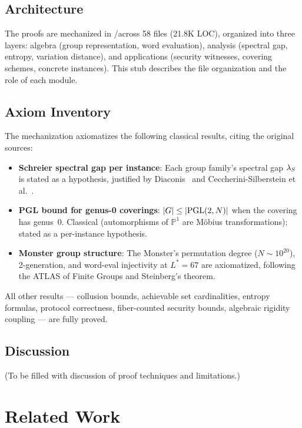 \documentclass[11pt,a4paper]{article}
\begin{document}
\subsection{Architecture}
\label{sec:arch}

The proofs are mechanized in \Rocq/\MathComp across 58 files (21.8K LOC), organized into three layers: algebra (group representation, word evaluation), analysis (spectral gap, entropy, variation distance), and applications (security witnesses, covering schemes, concrete instances).
This stub describes the file organization and the role of each module.

\subsection{Axiom Inventory}
\label{sec:axioms}

The mechanization axiomatizes the following classical results, citing the original sources:
\begin{itemize}
  \item \textbf{Schreier spectral gap per instance}: Each group family's spectral gap $\lambda_S$ is stated as a hypothesis, justified by Diaconis~\cite{diaconis1988} and Ceccherini-Silberstein et al.~\cite{ceccheriniSilberstein2008}.
  \item \textbf{PGL bound for genus-0 coverings}: $|G| \leq |\mathrm{PGL}(2,N)|$ when the covering has genus~0. Classical (automorphisms of $\mathbb{P}^1$ are M\"obius transformations); stated as a per-instance hypothesis.
  \item \textbf{Monster group structure}: The Monster's permutation degree ($N \sim 10^{20}$), 2-generation, and word-eval injectivity at $L^* = 67$ are axiomatized, following the ATLAS of Finite Groups and Steinberg's theorem.
\end{itemize}
All other results --- collusion bounds, achievable set cardinalities, entropy formulas, protocol correctness, fiber-counted security bounds, algebraic rigidity coupling --- are fully proved.

\subsection{Discussion}
\label{sec:lessons}

(To be filled with discussion of proof techniques and limitations.)

\section{Related Work}
\label{sec:related}
\end{document}
